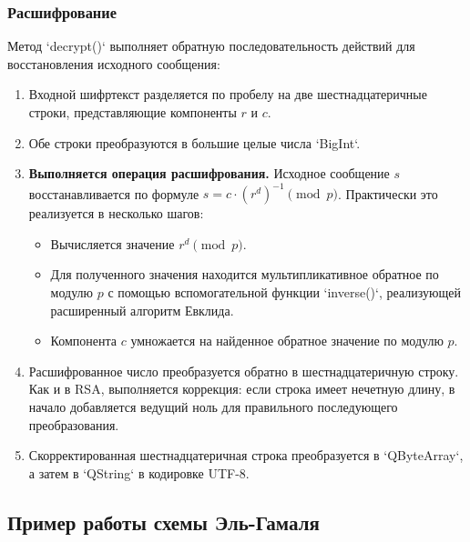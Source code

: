 \subsubsection*{Расшифрование}
Метод `decrypt()` выполняет обратную последовательность действий для восстановления исходного сообщения:
\begin{enumerate}
    \item Входной шифртекст разделяется по пробелу на две шестнадцатеричные строки, представляющие компоненты $r$ и $c$.
    \item Обе строки преобразуются в большие целые числа `BigInt`.
    \item \textbf{Выполняется операция расшифрования.} Исходное сообщение $s$ восстанавливается по формуле $s = c \cdot (r^d)^{-1} \pmod p$. Практически это реализуется в несколько шагов:
    \begin{itemize}
        \item Вычисляется значение $r^d \pmod p$.
        \item Для полученного значения находится мультипликативное обратное по модулю $p$ с помощью вспомогательной функции `inverse()`, реализующей расширенный алгоритм Евклида.
        \item Компонента $c$ умножается на найденное обратное значение по модулю $p$.
    \end{itemize}
    \item Расшифрованное число преобразуется обратно в шестнадцатеричную строку. Как и в RSA, выполняется коррекция: если строка имеет нечетную длину, в начало добавляется ведущий ноль для правильного последующего преобразования.
    \item Скорректированная шестнадцатеричная строка преобразуется в `QByteArray`, а затем в `QString` в кодировке UTF-8.
\end{enumerate}



\subsection{Пример работы схемы Эль-Гамаля}
